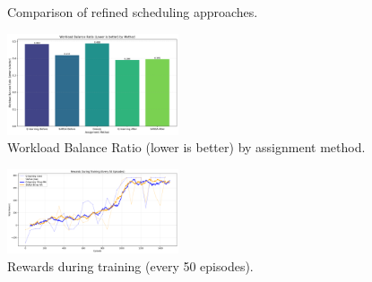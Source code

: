 \documentclass[conference]{IEEEtran}
\begin{document}
\begin{figure}[htbp]
	\centering
	\hfill
	\caption{Comparison of refined scheduling approaches.}
	\label{fig:refined}
\end{figure}

\begin{figure}[htbp]
	\centering
	\includegraphics[width=0.45\textwidth]{figures/Workload_Balance_Ratio.png}
	\caption{Workload Balance Ratio (lower is better) by assignment method.}
	\label{fig:workload_balance_ratio}
\end{figure}

\begin{figure}[htbp]
	\centering
	\includegraphics[width=0.45\textwidth]{figures/Rewards_During_Training.png}
	\caption{Rewards during training (every 50 episodes).}
	\label{fig:rewards_training}
\end{figure}
\end{document}
